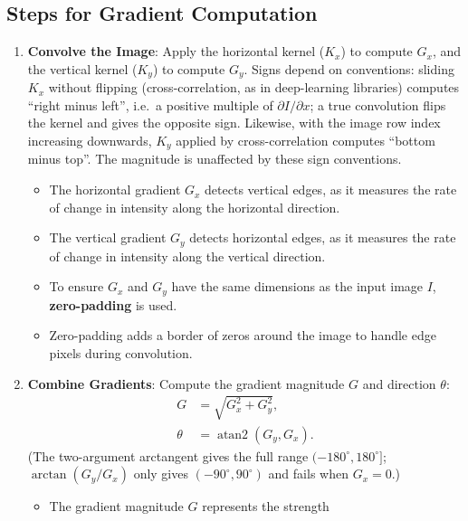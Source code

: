 \begin{notechapter}
\section{Steps for Gradient Computation}
\begin{enumerate}
        \item \textbf{Convolve the Image}:
        Apply the horizontal kernel ($K_x$) to compute $G_x$,
        and the vertical kernel ($K_y$) to compute $G_y$.
        Signs depend on conventions: sliding \( K_x \) without flipping (cross-correlation, as in
        deep-learning libraries) computes ``right minus left'', i.e.\ a positive multiple of
        \( \partial I/\partial x \); a true convolution flips the kernel and gives the opposite sign.
        Likewise, with the image row index increasing downwards, \( K_y \) applied by cross-correlation
        computes ``bottom minus top''. The magnitude is unaffected by these sign conventions.
        \begin{itemize}
            \item The horizontal gradient $G_x$ detects vertical edges,
                  as it measures the rate of change in intensity along
                  the horizontal direction.
            \item The vertical gradient $G_y$ detects horizontal edges,
                  as it measures the rate of change in intensity along
                  the vertical direction.
            \item To ensure $G_x$ and $G_y$ have the same dimensions
                  as the input image $I$, \textbf{zero-padding} is used.
            \item Zero-padding adds a border of zeros around the image
                  to handle edge pixels during convolution.
        \end{itemize}
    \item \textbf{Combine Gradients}:
        Compute the gradient magnitude $G$ and direction $\theta$:
        \begin{align*}
            G &= \sqrt{G_x^2 + G_y^2}, \\
                        \theta &= \operatorname{atan2}(G_y, G_x).
        \end{align*}
        (The two-argument arctangent gives the full range \( (-180^\circ, 180^\circ] \); \( \arctan(G_y/G_x) \)
        only gives \( (-90^\circ, 90^\circ) \) and fails when \( G_x = 0 \).)
        \begin{itemize}
            \item The gradient magnitude $G$ represents the strength

\end{itemize}
\end{enumerate}
\end{notechapter}
